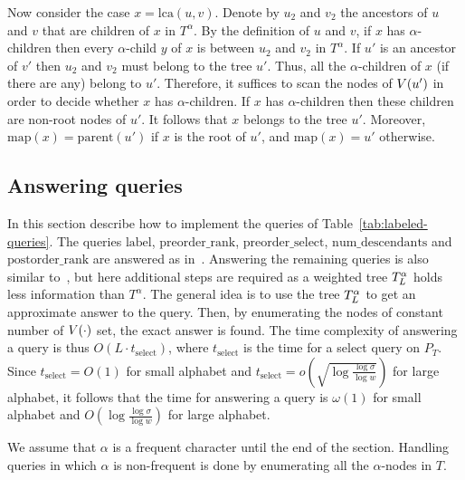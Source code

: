 \documentclass[12pt]{article}
\newcommand{\Labelb}{\mathrm{label}}
\newcommand{\parentb}{\mathrm{parent}}
\newcommand{\numdescendantsb}{\mathrm{num\_descendants}}
\newcommand{\preorderrankb}{\mathrm{preorder\_rank}}
\newcommand{\preorderselectb}{\mathrm{preorder\_select}}
\newcommand{\postorderrankb}{\mathrm{postorder\_rank}}
\newcommand{\lcab}{\mathrm{lca}}
\newcommand{\parentx}[1]{\parentb(#1)}
\newcommand{\lcax}[2]{\lcab(#1,#2)}
\newcommand{\tselect}{t_{\mathrm{select}}}
\newcommand{\map}[1]{\mathrm{map}(#1)}
\begin{document}
Now consider the case $x = \lcax{u}{v}$.
Denote by $u_2$ and $v_2$ the ancestors of $u$ and $v$ that are
children of $x$ in $T^\alpha$.
By the definition of $u$ and $v$, if $x$ has $\alpha$-children then
every $\alpha$-child $y$ of $x$ is between $u_2$ and $v_2$ in $T^\alpha$.
If  $u'$ is an ancestor of $v'$ then $u_2$ and $v_2$ must belong to the
tree $u'$.
Thus, all the $\alpha$-children of $x$ (if there are any) belong to $u'$.
Therefore, it suffices to scan the nodes of $V(u')$ in order to decide
whether $x$ has $\alpha$-children.
If $x$ has $\alpha$-children then these children are non-root nodes of $u'$.
It follows that $x$ belongs to the tree $u'$.
Moreover,
$\map{x}=\parentx{u'}$ if $x$ is the root of $u'$, and
$\map{x}=u'$ otherwise.

\subsection{Answering queries}
In this section describe how to implement the queries of
Table~\ref{tab:labeled-queries}.
The queries $\Labelb$, $\preorderrankb$, $\preorderselectb$,
$\numdescendantsb$ and $\postorderrankb$ are answered as in~\cite{HeMZ12}.
Answering the remaining queries is also similar to~\cite{HeMZ12},
but here additional steps are required as a weighted tree $T^\alpha_{L}$
holds less information than $T^\alpha$.
The general idea is to use the tree $T^\alpha_{L}$ to get an approximate
answer to the query. Then, by enumerating the nodes of constant number
of $V(\cdot)$ set, the exact answer is found.
The time complexity of answering a query is thus $O(L\cdot\tselect)$,
where $\tselect$ is the time for a select query on $P_T$.
Since $\tselect = O(1)$ for small alphabet
and $\tselect = o(\sqrt{\log\frac{\log\sigma}{\log w}})$ for large alphabet,
it follows that the time for answering a query is $\omega(1)$ for small alphabet
and $O(\log\frac{\log\sigma}{\log w})$ for large alphabet.

We assume that $\alpha$ is a frequent character until the end of the section.
Handling queries in which $\alpha$ is non-frequent is done by enumerating all
the $\alpha$-nodes in $T$.
\end{document}
